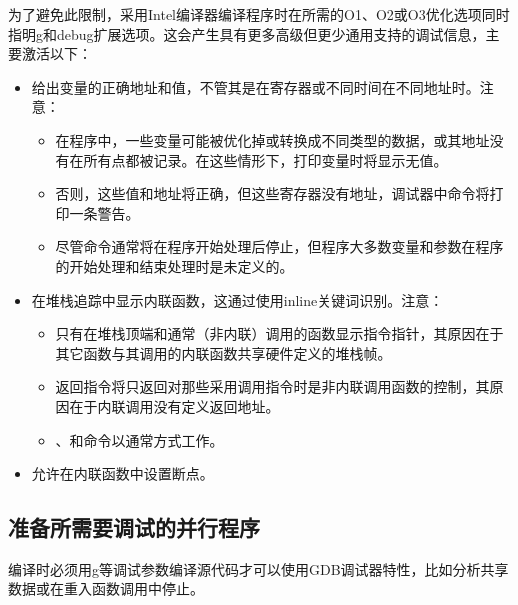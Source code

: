 \documentclass[a4paper,12pt,english]{sphinxmanual}
\begin{document}
\sphinxAtStartPar
为了避免此限制，采用Intel编译器编译程序时在所需的\sphinxhyphen{}O1、\sphinxhyphen{}O2或\sphinxhyphen{}O3优化选项同时指明\sphinxhyphen{}g和\sphinxhyphen{}debug扩展选项。这会产生具有更多高级但更少通用支持的调试信息，主要激活以下：
\begin{itemize}
\item {} 
\sphinxAtStartPar
给出变量的正确地址和值，不管其是在寄存器或不同时间在不同地址时。注意：
\begin{itemize}
\item {} 
\sphinxAtStartPar
在程序中，一些变量可能被优化掉或转换成不同类型的数据，或其地址没有在所有点都被记录。在这些情形下，打印变量时将显示无值。

\item {} 
\sphinxAtStartPar
否则，这些值和地址将正确，但这些寄存器没有地址，调试器中命令将打印一条警告。

\item {} 
\sphinxAtStartPar
尽管命令通常将在程序开始处理后停止，但程序大多数变量和参数在程序的开始处理和结束处理时是未定义的。

\end{itemize}

\item {} 
\sphinxAtStartPar
在堆栈追踪中显示内联函数，这通过使用inline关键词识别。注意：
\begin{itemize}
\item {} 
\sphinxAtStartPar
只有在堆栈顶端和通常（非内联）调用的函数显示指令指针，其原因在于其它函数与其调用的内联函数共享硬件定义的堆栈帧。

\item {} 
\sphinxAtStartPar
返回指令将只返回对那些采用调用指令时是非内联调用函数的控制，其原因在于内联调用没有定义返回地址。

\item {} 
\sphinxAtStartPar
{}、和命令以通常方式工作。

\end{itemize}

\item {} 
\sphinxAtStartPar
允许在内联函数中设置断点。

\end{itemize}


\subsection{准备所需要调试的并行程序}
\label{\detokenize{debug/debug:id10}}
\sphinxAtStartPar
编译时必须用\sphinxhyphen{}g等调试参数编译源代码才可以使用GDB调试器特性，比如分析共享数据或在重入函数调用中停止。
\end{document}
